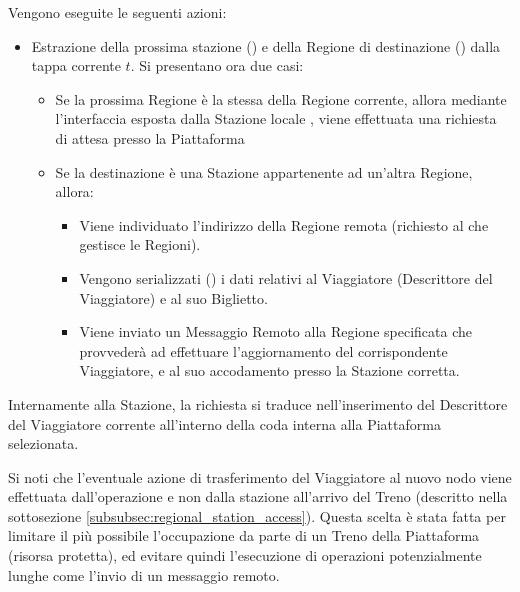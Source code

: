	Vengono eseguite le seguenti azioni:
		\begin{itemize}
			\item Estrazione della prossima stazione () e della Regione di destinazione () dalla tappa corrente $t$. Si presentano ora due casi:
				\begin{itemize}
					\item Se la prossima Regione è la stessa della Regione corrente, allora mediante l'interfaccia esposta dalla Stazione locale , viene effettuata una richiesta di attesa presso la Piattaforma \\
					\item Se la destinazione è una Stazione appartenente ad un'altra Regione, allora:
						\begin{itemize}
							\item Viene individuato l'indirizzo della Regione remota (richiesto al  che gestisce le Regioni).
							\item Vengono serializzati () i dati relativi al Viaggiatore (Descrittore del Viaggiatore) e al suo Biglietto.
							\item Viene inviato un Messaggio Remoto alla Regione specificata che provvederà ad effettuare l'aggiornamento del corrispondente Viaggiatore, e al suo accodamento presso la Stazione corretta.
						\end{itemize}
				\end{itemize}
		\end{itemize} 
		
	Internamente alla Stazione, la richiesta si traduce nell'inserimento del Descrittore del Viaggiatore corrente all'interno della coda  interna alla Piattaforma  selezionata.
	
	Si noti che l'eventuale azione di trasferimento del Viaggiatore al nuovo nodo viene effettuata dall'operazione  e non dalla stazione all'arrivo del Treno (descritto nella sottosezione \ref{subsubsec:regional_station_access}). Questa scelta è stata fatta per limitare il più possibile l'occupazione da parte di un Treno della Piattaforma (risorsa protetta), ed evitare quindi l'esecuzione di operazioni potenzialmente lunghe come l'invio di un messaggio remoto.

\newpage
	
